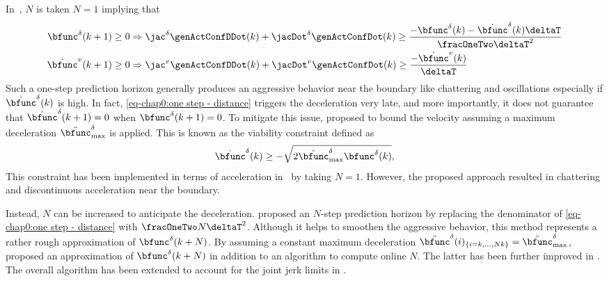 In~\cite{salini2011icra,saab2011icra,saab2013tro,sherikov2014humanoids,lober2017phdThesis}, $N$ is taken $N=1$ implying that
\begin{subequations}\label{eq-chap0:one step}
\begin{align}
	\label{eq-chap0:one step - distance}	\bfunc^{\delta}(k+1) &\geq 0 \Rightarrow \jac^{\delta}\genActConfDDot(k)+\jacDot^{\delta}\genActConfDot(k)\geq \frac{-\bfunc^{\delta}(k)- \dot{\bfunc}^{\delta}(k)\deltaT}{\fracOneTwo\deltaT^2}  \\ 
		\label{eq-chap0:one step - velocity}\dot{\bfunc}^{v}(k+1) &\geq  0\Rightarrow \jac^{v}\genActConfDDot(k)+\jacDot^{v}\genActConfDot(k)\geq\frac{ - \dot{\bfunc}^{v}(k)}{\deltaT}  
\end{align}
\end{subequations}
Such a one-step prediction horizon generally produces an aggressive behavior near the boundary like chattering and oscillations especially if $\dot{\bfunc}^{\delta}(k)$ is high. In fact, \cref{eq-chap0:one step - distance}  triggers the deceleration very late, and more importantly, it does not guarantee that $\dot{\bfunc}^{\delta}(k+1)=0$ when $\bfunc^{\delta}(k+1)=0$. To mitigate this issue, \cite{hu2014icra,flacco2012icra} proposed to bound the velocity  assuming a maximum deceleration $\ddot{\bfunc}^{\delta}_{\max}$ is applied. This is known as the viability constraint defined as
 \begin{equation}\label{eq-chap0:viability constraint}
 	\dot{\bfunc}^{\delta}(k) \geq -\sqrt{2\ddot{\bfunc}^{\delta}_{\max}\bfunc^{\delta}(k)},
 \end{equation}  This constraint has been implemented in terms of acceleration in~\cite{delprete2018ral} by taking $N=1$. 
However, the proposed approach resulted in chattering and discontinuous acceleration near the boundary.  
 
Instead, $N$ can be increased to anticipate the deceleration. \cite{park1998icra} proposed an $N$-step prediction horizon by replacing the denominator of \cref{eq-chap0:one step - distance} with $\fracOneTwo N\deltaT^2$. Although it helps to smoothen the aggressive behavior, this method represents a rather rough approximation of $\bfunc^{\delta}(k+N)$. By assuming a constant maximum deceleration $\ddot{\bfunc}^{\delta}(i)_{\{i=k,\ldots, Nk\}} = \ddot{\bfunc}^{\delta}_{\max}$,  \cite{decre2009icra} proposed an approximation of $\bfunc^{\delta}(k+N)$ in addition to an algorithm to compute online $N$. The latter has been further improved in \cite{rubrecht2010iros,rubrecht2012autonRobot}. The overall algorithm has been extended to account for the joint jerk limits in \cite{meguenani2017phdThesis}.

